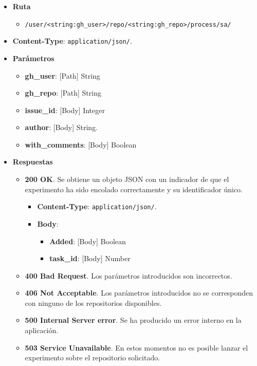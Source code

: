 \begin{itemize}
    \item[] \textbf{Ruta}
        \begin{itemize} \setlength\itemsep{0.2em}
            \item[] \texttt{/user/<string:gh\_user>/repo/<string:gh\_repo>/process/sa/}
        \end{itemize}
    \item[] \textbf{Content-Type}: \texttt{application/json/}.
    \item[] \textbf{Parámetros}
        \begin{itemize} \setlength\itemsep{0.2em}
            \item[] \textbf{gh\_user}: [Path] String
            \item[] \textbf{gh\_repo}: [Path] String
            \item[] \textbf{issue\_id}: [Body] Integer
            \item[] \textbf{author}: [Body] String.
            \item[] \textbf{with\_comments}: [Body] Boolean
        \end{itemize}
    \item[] \textbf{Respuestas}
        \begin{itemize} \setlength\itemsep{0.2em}
            \item[] \textbf{200 OK}. Se obtiene un objeto JSON con un indicador de que el experimento ha sido encolado correctamente y su identificador único.
                \begin{itemize} \setlength\itemsep{0.2em}
                    \item[] \textbf{Content-Type}: \texttt{application/json/}.
                    \item[] \textbf{Body}: 
                        \begin{itemize} \setlength\itemsep{0.2em}
                            \item[] \textbf{Added}: [Body] Boolean
                            \item[] \textbf{task\_id}: [Body] Number
                        \end{itemize}
                \end{itemize}
            \item[] \textbf{400 Bad Request}. Los parámetros introducidos son incorrectos.
            \item[] \textbf{406 Not Acceptable}. Los parámetros introducidos no se corresponden con ninguno de los repositorios disponibles.
            \item[] \textbf{500 Internal Server error}. Se ha producido un error interno en la aplicación.
            \item[] \textbf{503 Service Unavailable}. En estos momentos no es posible lanzar el experimento sobre el repositorio solicitado.
        \end{itemize}
\end{itemize}

